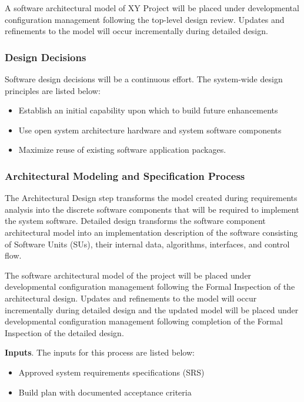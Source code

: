 \documentclass[a4paper, 11pt]{article}
\begin{document}
A software architectural model of XY Project will be placed under developmental configuration management following the top-level design review. Updates and refinements to the model will occur incrementally during detailed design.

\subsubsection{Design Decisions}
Software design decisions will be a continuous effort. The system-wide design principles are listed below:
\begin{itemize}
	\item Establish an initial capability upon which to build future enhancements
	\item Use open system architecture hardware and system software components
	\item Maximize reuse of existing software application packages.
\end{itemize}

\subsubsection{Architectural Modeling and Specification Process}
The Architectural Design step transforms the model created during requirements analysis into the discrete software components that will be required to implement the system software. Detailed design transforms the software component architectural model into an implementation description of the software consisting of Software Units (SUs), their internal data, algorithms, interfaces, and control flow.

The software architectural model of the project will be placed under developmental configuration management following the Formal Inspection of the architectural design. Updates and refinements to the model will occur incrementally during detailed design and the updated model will be placed under developmental configuration management following completion of the Formal Inspection of the detailed design.

\textbf{Inputs}. The inputs for this process are listed below:
\begin{itemize}
	\item Approved system requirements specifications (SRS)
	\item Build plan with documented acceptance criteria
\end{itemize}
\end{document}
